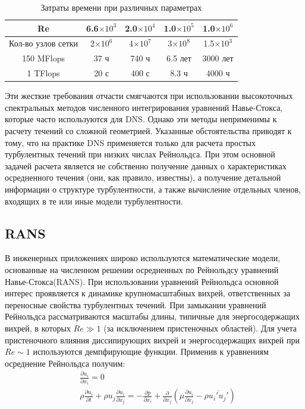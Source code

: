 	\begin{table}[H]
		\begin{center}
			\begin{tabular}{|c|c|c|c|c|}
				\hline
				Re & 6.6$\times10^3$ & 2.0$\times10^4$ & 1.0$\times10^5$ & 1.0$\times10^6$\\
				\hline
				Кол-во узлов сетки & 2$\times10^6$ & 4$\times10^7$ & 3$\times10^8$ & 1.5$\times10^3$\\
				\hline
				150 MFlops & 37 ч & 740 ч & 6.5 лет & 3000 лет\\
				\hline
				1 TFlops & 20 с & 400 с & 8.3 ч & 4000 ч\\
				\hline
			\end{tabular}
		\end{center}
		\caption{Затраты времени при различных параметрах}
	\end{table}

	Эти жесткие требования отчасти смягчаются при использовании высокоточных спектральных методов численного интегрирования уравнений Навье-Стокса, которые	часто используются для DNS. Однако эти методы неприменимы к расчету течений со сложной геометрией. Указанные обстоятельства приводят к тому, что на практике DNS применяется только для расчета простых турбулентных течений при низких числах Рейнольдса. При этом основной задачей расчета является не	собственно получение данных о характеристиках осредненного течения (они, как правило, известны), а получение детальной информации о структуре турбулентности, а также вычисление отдельных членов, входящих в те или иные модели турбулентности.

\subsection{RANS}
	
	В инженерных приложениях широко используются математические модели, основанные на численном решении осредненных по Рейнольдсу уравнений Навье-Стокса(RANS). При использовании уравнений Рейнольдса основной интерес проявляется к динамике крупномасштабных вихрей, ответственных за переносные свойства турбулентных течений. При замыкании уравнений Рейнольдса рассматриваются масштабы длины, типичные для энергосодержащих вихрей, в которых $Re\gg1$ (за исключением пристеночных областей). Для учета пристеночного влияния диссипирующих вихрей и энергосодержащих вихрей при $Re\sim1$ используются демпфирующие функции. Применив к уравнениям осреднение Рейнольдса получим:
	\begin{align}
				&\frac{\partial u_i}{\partial x_i} = 0 \nonumber\\
				&\rho\frac{\partial u_i}{\partial t} + \rho u_j \frac{\partial u_i}{\partial x_j} = - \frac{\partial p}{\partial x_i} + \frac{\partial}{\partial x_j}(\mu\frac{\partial u_i}{\partial x_j} - \rho\overline{u_i' u_j'})
	\end{align}

